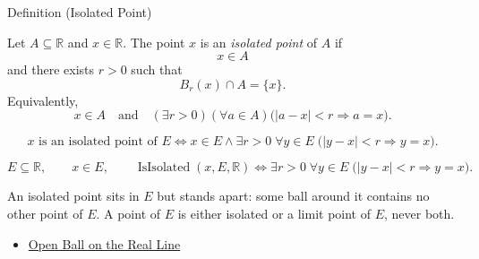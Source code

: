 \begin{definitionbox}{Definition (Isolated Point)}
\begin{definition}
\label{def:isolated-point}
Let $A\subseteq\mathbb{R}$ and $x\in\mathbb{R}$.  The point $x$ is an
\emph{isolated point} of $A$ if
\[
  x\in A
\]
and there exists $r>0$ such that
\[
  B_r(x)\cap A=\{x\}.
\]
Equivalently,
\[
  x\in A
  \quad\text{and}\quad
  (\exists r>0)(\forall a\in A)
  \bigl(|a-x|<r\Longrightarrow a=x\bigr).
\]
\end{definition}
\end{definitionbox}
\begin{remark*}
\[
x \text{ is an isolated point of } E
\Longleftrightarrow
x\in E \land \exists r>0\;\forall y\in E\;\bigl(|y-x|<r \Longrightarrow y=x\bigr).
\]
\end{remark*}

\begin{remark*}
\[
E\subseteq\mathbb{R},\qquad x\in E,\qquad
\operatorname{IsIsolated}(x,E,\mathbb{R})
\Longleftrightarrow
\exists r>0\;\forall y\in E\;\bigl(|y-x|<r \Longrightarrow y=x\bigr).
\]
\end{remark*}
\begin{remark*}[Interpretation]
An isolated point sits in $E$ but stands apart: some ball around it contains no other point of $E$. A point of $E$ is either isolated or a limit point of $E$, never both.
\end{remark*}
\begin{dependencies}
\begin{itemize}
  \item \hyperref[def:open-ball]{Open Ball on the Real Line}
\end{itemize}
\end{dependencies}
